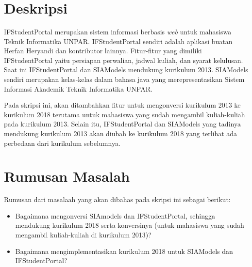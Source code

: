 \documentclass[a4paper,twoside]{article}
\begin{document}
\title{\@judultopik}
\author{\nama \textendash \@npm} 

\newcommand{\nama}{Andrianto Sugiarto}
\newcommand{\@npm}{2013730046}
\newcommand{\@judultopik}{Migrasi SIAModels dan IFStudentPortal ke Kurikulum 2018} %
\newcommand{\jumpemb}{1} %
\newcommand{\tanggal}{26/01/2018}
\maketitle


\section{Deskripsi}

\paragraph{} IFStudentPortal merupakan sistem informasi berbasis \textit{web} untuk mahasiswa Teknik Informatika UNPAR. IFStudentPortal sendiri adalah aplikasi buatan Herfan Heryandi dan kontributor lainnya. Fitur-fitur yang dimiliki IFStudentPortal yaitu persiapan perwalian, jadwal kuliah, dan syarat kelulusan. Saat ini IFStudentPortal dan SIAModels mendukung kurikulum 2013. SIAModels sendiri merupakan kelas-kelas dalam bahasa java yang merepresentasikan Sistem Informasi Akademik Teknik Informatika UNPAR.

Pada skripsi ini, akan ditambahkan fitur untuk mengonversi kurikulum 2013 ke kurikulum 2018 terutama untuk mahasiswa yang sudah mengambil kuliah-kuliah pada kurikulum 2013. Selain itu, IFStudentPortal dan SIAModels yang tadinya mendukung kurikulum 2013 akan diubah ke kurikulum 2018 yang terlihat ada perbedaan dari kurikulum sebelumnya.



\section{Rumusan Masalah}
Rumusan dari masalaah yang akan dibahas pada skripsi ini sebagai berikut:
\begin{itemize}
	\item Bagaimana mengonversi SIAmodels dan IFStudentPortal, sehingga mendukung kurikulum 2018 serta konversinya (untuk mahasiswa yang sudah mengambil kuliah-kuliah di kurikulum 2013)?
	\item Bagaimana mengimplementasikan kurikulum 2018 untuk SIAModels dan IFStudentPortal?
\end{itemize}
\end{document}
